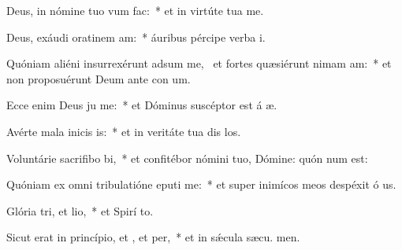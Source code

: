 \item Deus, in nómine tuo vum  fac:~* et in virtúte tua  me.
\item Deus, exáudi oratinem am:~* áuribus pércipe verba  i.
\item Quóniam aliéni insurrexérunt adsum me,~\pscross{} et fortes quæsiérunt nimam am:~* et non proposuérunt Deum ante con um.
\item Ecce enim Deus ju me:~* et Dóminus suscéptor est á æ.
\item Avérte mala inicis is:~* et in veritáte tua dis los.
\item Voluntárie sacrifibo bi,~* et confitébor nómini tuo, Dómine: quón num est:
\item Quóniam ex omni tribulatióne eputi me:~* et super inimícos meos despéxit ó us.
\item Glória tri, et lio,~* et Spirí to.
\item Sicut erat in princípio, et , et per,~* et in sǽcula sæcu. men.
